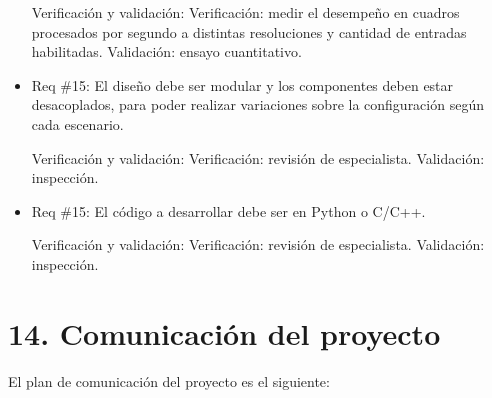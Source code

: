 \documentclass[11pt]{charter}
\begin{document}
\begin{itemize}
Verificación y validación:
\subitem Verificación: medir el desempeño en cuadros procesados por segundo a distintas resoluciones y cantidad de entradas habilitadas.
\subitem Validación: ensayo cuantitativo.

\item Req \#15:  El diseño debe ser modular y los componentes deben estar desacoplados, para poder realizar variaciones sobre la configuración según cada escenario.

\pagebreak

Verificación y validación:
\subitem Verificación: revisión de especialista.
\subitem Validación: inspección.

\item Req \#15: El código a desarrollar debe ser en Python o C/C++.

Verificación y validación:
\subitem Verificación: revisión de especialista.
\subitem Validación: inspección.

\end{itemize} %


\section{14. Comunicación del proyecto}
\label{sec:comunicaciones}

El plan de comunicación del proyecto es el siguiente:
\end{document}
